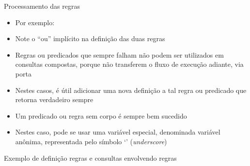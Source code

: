 \begin{frame}[fragile]{Processamento das regras}

    \begin{itemize}
        \item Por exemplo:


        \item Note o ``ou'' implícito na definição das duas regras

        \item Regras ou predicados que sempre falham não podem ser utilizados em consultas 
            compostas, porque não transferem o fluxo de execução adiante, via porta 

        \item Nestes casos, é útil adicionar uma nova definição a tal regra ou predicado que 
            retorna verdadeiro sempre

        \item Um predicado ou regra sem corpo é sempre bem sucedido

        \item Nestes caso, pode se usar uma variável especial, denominada variável anônima,
            representada pelo símbolo `' (\textit{underscore})

    \end{itemize}

\end{frame}


\begin{frame}[fragile]{Exemplo de definição regras e consultas envolvendo regras}


\end{frame}

